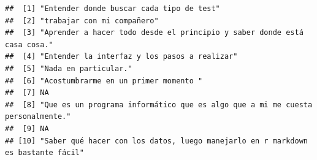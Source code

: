 \documentclass[
]{article}
\newenvironment{Shaded}{\begin{snugshade}}{\end{snugshade}}
\newcommand{\CommentTok}[1]{\textcolor[rgb]{0.56,0.35,0.01}{\textit{#1}}}
\newcommand{\NormalTok}[1]{#1}
\newcommand{\SpecialCharTok}[1]{\textcolor[rgb]{0.81,0.36,0.00}{\textbf{#1}}}
\begin{document}
\begin{Shaded}
\end{Shaded}

\begin{verbatim}
##  [1] "Entender donde buscar cada tipo de test"                                                                                                                                                                                      
##  [2] "trabajar con mi compañero"                                                                                                                                                                                                    
##  [3] "Aprender a hacer todo desde el principio y saber donde está casa cosa."                                                                                                                                                       
##  [4] "Entender la interfaz y los pasos a realizar"                                                                                                                                                                                  
##  [5] "Nada en particular."                                                                                                                                                                                                          
##  [6] "Acostumbrarme en un primer momento "                                                                                                                                                                                          
##  [7] NA                                                                                                                                                                                                                             
##  [8] "Que es un programa informático que es algo que a mi me cuesta personalmente."                                                                                                                                                 
##  [9] NA                                                                                                                                                                                                                             
## [10] "Saber qué hacer con los datos, luego manejarlo en r markdown es bastante fácil"                                                                                                                                               

\end{verbatim}
\end{document}
